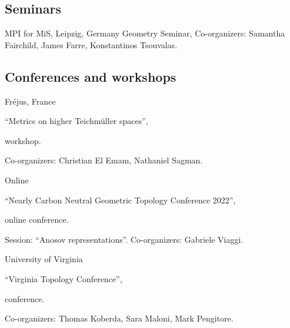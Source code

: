 
\subsection{Seminars}

{MPI for MiS, Leipzig, Germany}
{Geometry Seminar,}
{Co-organizers: Samantha Fairchild, James Farre, Konstantinos Tsouvalas.}


\subsection{Conferences and workshops}

{Fr\'ejus, France}
{``Metrics on higher Teichm\"uller spaces'', \begin{footnotesize}
		workshop.
\end{footnotesize}}
{Co-organizers: Christian El Emam, Nathaniel Sagman.}

\vspace{0.5em}

{Online}
{``Nearly Carbon Neutral Geometric Topology Conference 2022'', \begin{footnotesize}
		online conference.
\end{footnotesize}}
{Session: ``Anosov representations''. Co-organizers: Gabriele Viaggi.}

\vspace{0.5em}

{University of Virginia}
{``Virginia Topology Conference'', \begin{footnotesize}
		conference.
\end{footnotesize}}
{Co-organizers: Thomas Koberda, Sara Maloni, Mark Pengitore.}
%